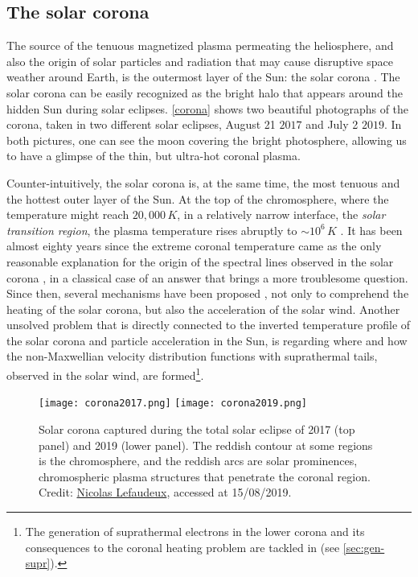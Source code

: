 \documentclass[12pt,a4paper,ruledheader]{report}
\begin{document}
\begin{appendix}
\subsection{The solar corona}
\label{sec:corona}
The source of the tenuous magnetized plasma permeating the heliosphere, and
also the origin of solar particles and radiation that may cause disruptive
space weather around Earth, is the outermost layer of the Sun: the solar
corona \cite{Cranmer2017,Klein2017}. The solar corona can be easily recognized
as the bright halo that appears around the hidden Sun during solar eclipses.
\autoref{corona} shows two beautiful photographs of the corona, taken in two
different solar eclipses, August 21 $2017$ and July 2 $2019$. In both pictures,
one can see the moon covering the bright photosphere, allowing us to have a
glimpse of the thin, but ultra-hot coronal plasma.

Counter-intuitively, the solar corona is, at the same time, the most tenuous
and the hottest outer layer of the Sun. At the top of the chromosphere, where
the temperature might reach $20,000\,\unit{K}$, in a relatively narrow interface,
the \emph{solar transition region}, the plasma temperature rises abruptly to
$\sim 10^6\,\unit{K}$ \cite{BenzA2002}. It has been almost eighty years since
the extreme coronal temperature came as the only reasonable explanation for the
origin of the spectral lines observed in the solar corona \cite{Hunter1942},
in a classical case of an answer that brings a more troublesome question. 
Since then, several mechanisms have been proposed \cite{Parker1988,Scudder92b,
  Vinas2000,PP14}, not only to comprehend the heating of the solar corona,
but also the acceleration of the solar wind. Another unsolved problem that is
directly connected to the inverted temperature profile of the solar corona and
particle acceleration in the Sun, is regarding where and how the non-Maxwellian
velocity distribution functions with suprathermal tails, observed in the solar
wind, are formed\footnote{The generation of suprathermal electrons in the lower
  corona and its consequences to the coronal heating problem are tackled in
  \cite{Tigik2017a} (see \autoref{sec:gen-supr}).}.
\begin{figure}
  \begin{center}
    \texttt{[image: corona2017.png]}
    \texttt{[image: corona2019.png]}
    \caption{Solar corona captured during the total solar eclipse of 2017 (top panel)
      and 2019 (lower panel). The reddish contour at some regions is the chromosphere,
      and the reddish arcs are solar prominences, chromospheric plasma structures that
      penetrate the coronal region.
      {\footnotesize Credit:}
      \href{https://hdr-astrophotography.com}
      {\footnotesize Nicolas Lefaudeux}{\footnotesize , accessed at 15/08/2019}.}
    \label{corona}
  \end{center}
\end{figure}


\end{appendix}
\end{document}
